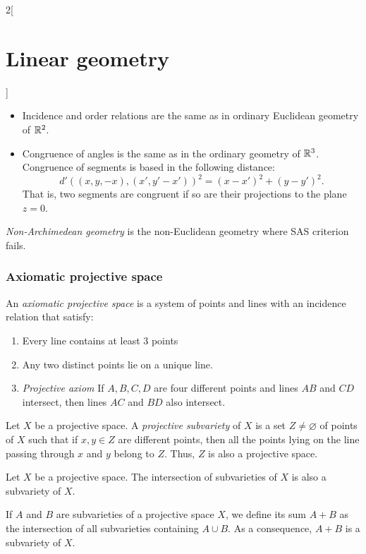 \documentclass[../../../main.tex]{subfiles}
\begin{document}
\begin{multicols}{2}[\section{Linear geometry}]
\begin{proposition}
\begin{itemize}
      \item Incidence and order relations are the same as in ordinary Euclidean geometry of $\mathbb{R}^2$.
      \item Congruence of angles is the same as in the ordinary geometry of $\mathbb{R}^3$. Congruence of segments is based in the following distance:  $$d'((x,y,-x),(x',y'-x'))^2=(x-x')^2+(y-y')^2.$$ That is, two segments are congruent if so are their projections to the plane $z=0$.
    \end{itemize}
  \end{proposition}
  \begin{definition}
    \emph{Non-Archimedean geometry} is the non-Euclidean geometry where SAS criterion fails.
  \end{definition}
  \subsubsection{Axiomatic projective space}
  \begin{definition}
    An \emph{axiomatic projective space} is a system of points and lines with an incidence relation that satisfy:
    \begin{enumerate}
      \item Every line contains at least 3 points
      \item Any two distinct points lie on a unique line.
      \item \emph{Projective axiom} If $A,B,C,D$ are four different points and lines $AB$ and $CD$ intersect, then lines $AC$ and $BD$ also intersect.
    \end{enumerate}
  \end{definition}
  \begin{definition}
    Let $X$ be a projective space. A \emph{projective subvariety} of $X$ is a set $Z\ne\varnothing$ of points of $X$ such that if $x,y\in Z$ are different points, then all the points lying on the line passing through $x$ and $y$ belong to $Z$. Thus, $Z$ is also a projective space.
  \end{definition}
  \begin{proposition}
    Let $X$ be a projective space. The intersection of subvarieties of $X$ is also a subvariety of $X$.
  \end{proposition}
  \begin{proposition}
    If $A$ and $B$ are subvarieties of a projective space $X$, we define its sum $A+B$ as the intersection of all subvarieties containing $A\cup B$. As a consequence, $A+B$ is a subvariety of $X$.

\end{proposition}
\end{multicols}
\end{document}
